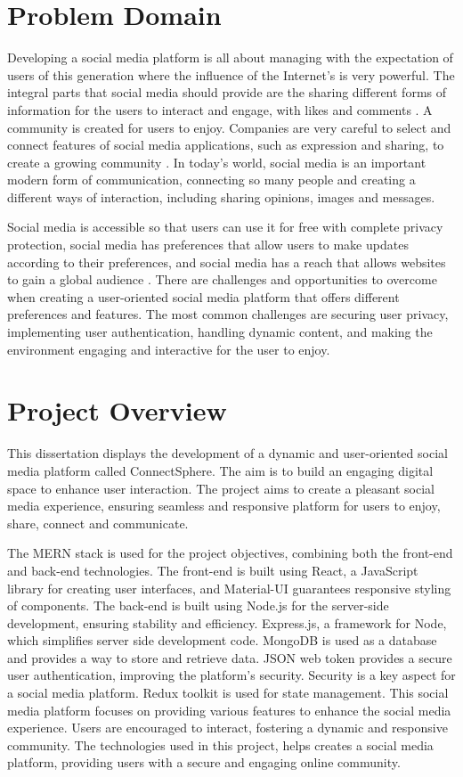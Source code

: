 \section{Problem Domain}
Developing a social media platform is all about managing with the expectation of users of this generation where the influence of the Internet's is very powerful. The integral parts that social media should provide are the sharing different forms of information for the users to interact and engage, with likes and comments \cite{go2016but}. A community is created for users to enjoy. Companies are very careful to select and connect features of social media applications, such as expression and sharing, to create a growing community \cite{go2016but}. In today's world, social media is an important modern form of communication, connecting so many people and creating a different ways of interaction, including sharing opinions, images and messages. 

Social media is accessible so that users can use it for free with complete privacy protection, social media has preferences that allow users to make updates according to their preferences, and social media has a reach that allows websites to gain a global audience \cite{agarwal2010information}. There are challenges and opportunities to overcome when creating a user-oriented social media platform that offers different preferences and features. The most common challenges are securing user privacy, implementing user authentication, handling dynamic content, and making the environment engaging and interactive for the user to enjoy. 

\section{Project Overview}
This dissertation displays the development of a dynamic and user-oriented social media platform called ConnectSphere. The aim is to build an engaging digital space to enhance user interaction. The project aims to create a pleasant social media experience, ensuring seamless and responsive platform for users to enjoy, share, connect and communicate.

The MERN stack is used for the project objectives, combining both the front-end and back-end technologies. The front-end is built using React, a JavaScript library for creating user interfaces, and Material-UI guarantees responsive styling of components. The back-end is built using Node.js for the server-side development, ensuring stability and efficiency. Express.js, a framework for Node, which simplifies server side development code. MongoDB is used as a database and provides a way to store and retrieve data. JSON web token provides a secure user authentication, improving the platform's security. Security is a key aspect for a social media platform. Redux toolkit is used for state management. This social media platform focuses on providing various features to enhance the social media experience. Users are encouraged to interact, fostering a dynamic and responsive community. The technologies used in this project, helps creates a social media platform, providing users with a secure and engaging online community.